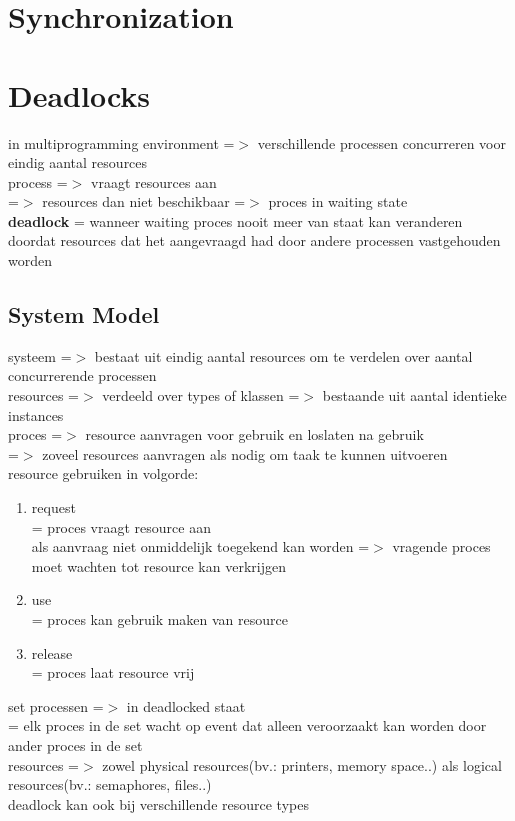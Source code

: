 \documentclass{report}
\begin{document}
\chapter{Synchronization}
\chapter{Deadlocks}
in multiprogramming environment =$>$ verschillende processen concurreren voor eindig aantal resources
\\process =$>$ vraagt resources aan
\\=$>$ resources dan niet beschikbaar =$>$ proces in waiting state
\\\textbf{deadlock} = wanneer waiting proces nooit meer van staat kan veranderen doordat resources dat het aangevraagd had  door andere processen vastgehouden worden
\section{System Model}
systeem =$>$ bestaat uit eindig aantal resources om te verdelen over aantal concurrerende processen
\\resources =$>$ verdeeld over types of klassen =$>$ bestaande uit aantal identieke instances
\\proces =$>$ resource aanvragen voor gebruik en loslaten na gebruik
\\=$>$ zoveel resources aanvragen als nodig om taak te kunnen uitvoeren
\\resource gebruiken in volgorde:
\begin{enumerate}
\item request
\\= proces vraagt resource aan 
\\als aanvraag niet onmiddelijk toegekend kan worden =$>$ vragende proces moet wachten tot resource kan verkrijgen
\item use
\\= proces kan gebruik maken van resource
\item release
\\= proces laat resource vrij
\end{enumerate}
set processen =$>$ in deadlocked staat 
\\= elk proces in de set wacht op event dat alleen veroorzaakt kan worden door ander proces in de set
\\resources =$>$ zowel physical resources(bv.: printers, memory space..) als logical resources(bv.: semaphores, files..)
\\deadlock kan ook bij verschillende resource types
\end{document}
